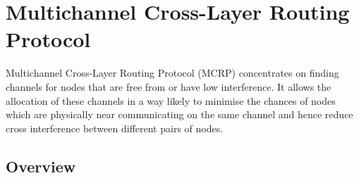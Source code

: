\section{Multichannel Cross-Layer Routing Protocol}
\label{sec:multichannel}

Multichannel Cross-Layer Routing Protocol (MCRP) concentrates on finding channels for nodes that are free from or have low interference. It allows the allocation of these channels in a way likely to minimise the chances of nodes which are physically near communicating on the same channel and hence reduce cross interference between different pairs of nodes.

\subsection{Overview}


